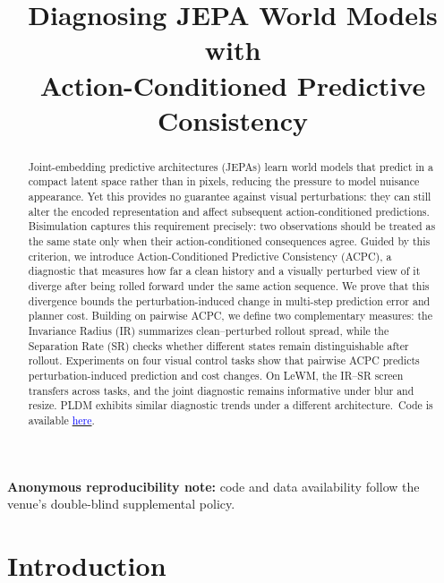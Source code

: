 \documentclass[10pt]{article}
\title{\textbf{Diagnosing JEPA World Models with\\Action-Conditioned Predictive Consistency}}
\author{\paperauthors}
\date{}
\begin{document}
\maketitle
\ifdefined\blindsubmission\else
  \begingroup
  \renewcommand{\thefootnote}{}
  \makeatletter
  \def\Hy@footnote@currentHref{paper.authornotes}
  \makeatother
  \footnotetext{\arxivauthornotes}
  \endgroup
\fi

\begin{abstract}
Joint-embedding predictive architectures (JEPAs) learn world models that
predict in a compact latent space rather than in pixels, reducing the
pressure to model nuisance appearance. Yet this provides no guarantee against visual perturbations: they can
still alter the encoded representation and affect subsequent
action-conditioned predictions.
Bisimulation captures this requirement precisely: two observations should be
treated as the same state only when their action-conditioned consequences
agree. Guided by this criterion, we introduce Action-Conditioned Predictive
Consistency (ACPC), a diagnostic that measures how far a clean history and
a visually perturbed view of it diverge after being rolled forward under the
same action sequence. We prove that this divergence bounds the
perturbation-induced change in multi-step prediction error and planner cost.
Building on pairwise ACPC, we define two complementary measures: the
Invariance Radius (IR) summarizes clean--perturbed rollout spread, while the
Separation Rate (SR) checks whether different states remain distinguishable
after rollout.
Experiments on four visual control tasks show that pairwise ACPC predicts
perturbation-induced prediction and cost changes. On LeWM, the IR--SR screen
transfers across tasks, and the joint diagnostic remains
informative under blur and resize. PLDM exhibits similar diagnostic trends
under a different architecture.\ifdefined\blindsubmission\else\
Code is available \href{\paperpubliccodeurl}{\textcolor{blue}{here}}.\fi

\end{abstract}

\smallskip
\ifdefined\blindsubmission
\noindent\textbf{Anonymous reproducibility note:} code and data availability follow the venue's double-blind supplemental policy.
\fi

\section{Introduction}\label{sec:intro}
\end{document}
